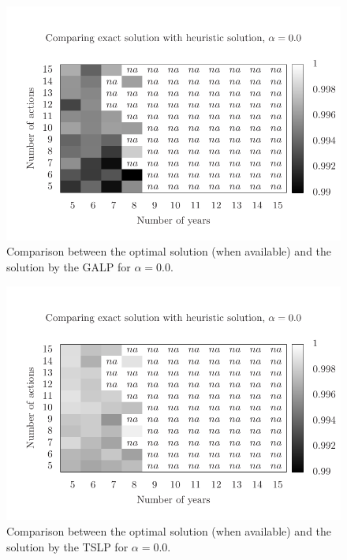 \begin{figure}
\centering
\includegraphics[scale=0.73, trim=0.75cm 0cm 0 2cm, clip=true]{imgs/comp_very_hard.pdf}
\caption{Comparison between the optimal solution (when available) 
and the solution by the GALP for $\alpha=0.0$.}
\label{fig:mh1_1}
\end{figure}

\begin{figure}
\centering
\includegraphics[scale=0.73, trim=0.75cm 0cm 0 2cm, clip=true]{imgs/comp_very_hard_ts.pdf}
\caption{Comparison between the optimal solution (when available) 
and the solution by the TSLP for $\alpha=0.0$.}
\label{fig:mh2_1}
\end{figure} 

